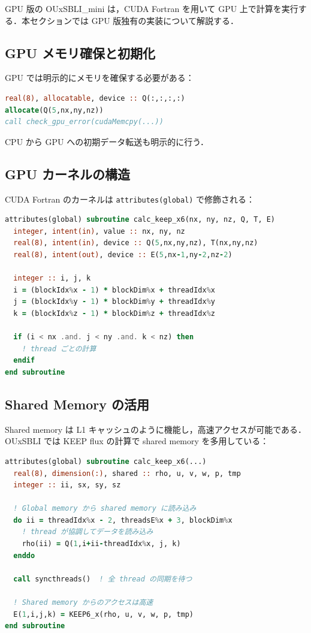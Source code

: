 GPU 版の OUxSBLI\_mini は，CUDA Fortran を用いて GPU 上で計算を実行する．本セクションでは GPU 版独有の実装について解説する．

\subsection{GPU メモリ確保と初期化}

GPU では明示的にメモリを確保する必要がある：

\begin{lstlisting}[language=Fortran]
real(8), allocatable, device :: Q(:,:,:,:)
allocate(Q(5,nx,ny,nz))
call check_gpu_error(cudaMemcpy(...))
\end{lstlisting}

CPU から GPU への初期データ転送も明示的に行う．

\subsection{GPU カーネルの構造}

CUDA Fortran のカーネルは \texttt{attributes(global)} で修飾される：

\begin{lstlisting}[language=Fortran]
attributes(global) subroutine calc_keep_x6(nx, ny, nz, Q, T, E)
  integer, intent(in), value :: nx, ny, nz
  real(8), intent(in), device :: Q(5,nx,ny,nz), T(nx,ny,nz)
  real(8), intent(out), device :: E(5,nx-1,ny-2,nz-2)

  integer :: i, j, k
  i = (blockIdx%x - 1) * blockDim%x + threadIdx%x
  j = (blockIdx%y - 1) * blockDim%y + threadIdx%y
  k = (blockIdx%z - 1) * blockDim%z + threadIdx%z

  if (i < nx .and. j < ny .and. k < nz) then
    ! thread ごとの計算
  endif
end subroutine
\end{lstlisting}

\subsection{Shared Memory の活用}

Shared memory は L1 キャッシュのように機能し，高速アクセスが可能である．OUxSBLI では KEEP flux の計算で shared memory を多用している：

\begin{lstlisting}[language=Fortran]
attributes(global) subroutine calc_keep_x6(...)
  real(8), dimension(:), shared :: rho, u, v, w, p, tmp
  integer :: ii, sx, sy, sz

  ! Global memory から shared memory に読み込み
  do ii = threadIdx%x - 2, threadsE%x + 3, blockDim%x
    ! thread が協調してデータを読み込み
    rho(ii) = Q(1,i+ii-threadIdx%x, j, k)
  enddo

  call syncthreads()  ! 全 thread の同期を待つ

  ! Shared memory からのアクセスは高速
  E(1,i,j,k) = KEEP6_x(rho, u, v, w, p, tmp)
end subroutine
\end{lstlisting}

